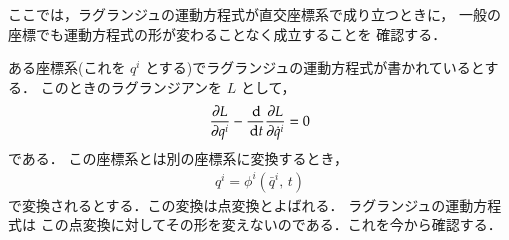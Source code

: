             ここでは，ラグランジュの運動方程式が直交座標系で成り立つときに，
            一般の座標でも運動方程式の形が変わることなく成立することを
            確認する．

            ある座標系(これを $q^{i}$ とする)でラグランジュの運動方程式が書かれているとする．
            このときのラグランジアンを $L$ として，
                                    \begin{align}\label{eq:ラグランジュ1}
                                        \frac{\rd L}{\rd q^{i}}
                                        -\frac{\df }{\df t} \frac{\rd L}{\rd \dot{q}^{i}}=0
                                    \end{align}
            である．
            この座標系とは別の座標系に変換するとき，
                \begin{align}\label{eq:henkan}
                    q^{i}=\phi^{i} (\bar{q}^{i},\,t)
                \end{align}
            で変換されるとする．この変換は点変換とよばれる．
            ラグランジュの運動方程式は
            この点変換に対してその形を変えないのである．これを今から確認する．


